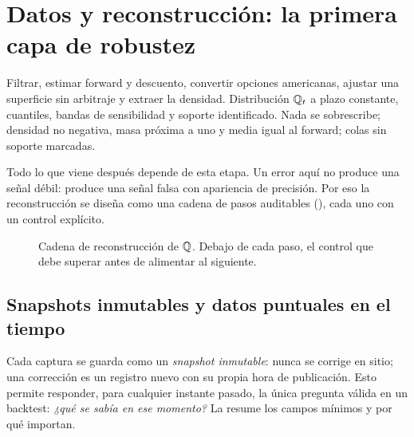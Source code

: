 \clearpage
\section{Datos y reconstrucción: la primera capa de robustez}\label{sec:datos}

{Filtrar, estimar forward y descuento, convertir opciones americanas, ajustar una superficie sin
arbitraje y extraer la densidad.}
{Distribución $\mathbb{Q}_t$ a plazo constante, cuantiles, bandas de sensibilidad y soporte identificado.}
{Nada se sobrescribe; densidad no negativa, masa próxima a uno y media igual al forward; colas sin
soporte marcadas.}

Todo lo que viene después depende de esta etapa. Un error aquí no produce una señal débil: produce una
señal falsa con apariencia de precisión. Por eso la reconstrucción se diseña como una cadena de pasos
auditables (), cada uno con un control explícito.

\begin{figure}[H]
\centering
\resizebox{\linewidth}{!}{}
\caption{Cadena de reconstrucción de $\mathbb{Q}$. Debajo de cada paso, el control que debe superar antes de
alimentar al siguiente.}
\label{fig:flujo_q}
\end{figure}

\subsection{Snapshots inmutables y datos puntuales en el tiempo}\label{sec:snapshots}

Cada captura se guarda como un \emph{snapshot inmutable}: nunca se corrige en sitio; una corrección es
un registro nuevo con su propia hora de publicación. Esto permite responder, para cualquier instante
pasado, la única pregunta válida en un backtest: \emph{¿qué se sabía en ese momento?}
La  resume los campos mínimos y por qué importan.

